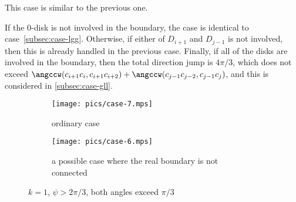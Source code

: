 \begin{enumerate}[label={\bf Case \arabic*: }, wide, labelwidth=!, labelindent=0pt]
This case is similar to the previous one.



If the $0$-disk is not involved in the boundary, the case is identical to case~\ref{subsec:case-lgg}. Otherwise, if either of $D_{i+1}$ and $D_{j-1}$ is not involved, then this is already handled in the previous case. Finally, if all of the disks are involved in the boundary, then the total direction jump is $4\pi/3$, which does not exceed $\angccw(c_{i+1}c_i, c_{i+1}c_{i+2}) + \angccw(c_{j-1}c_{j-2}, c_{j-1}c_j)$, and this is considered in \ref{subsec:case-gll}.

\begin{figure}[h!]
    \centering
    \begin{subfigure}{.45\textwidth}
    \texttt{[image: pics/case-7.mps]}
    \caption{ordinary case}
    \end{subfigure}
    \begin{subfigure}{.45\textwidth}
    \texttt{[image: pics/case-6.mps]}
    \caption{a possible case where the real boundary is not connected}
    \end{subfigure}
    \caption{$k = 1$, $\psi > 2\pi/3$, both angles exceed $\pi/3$}
\end{figure}




\end{enumerate}
